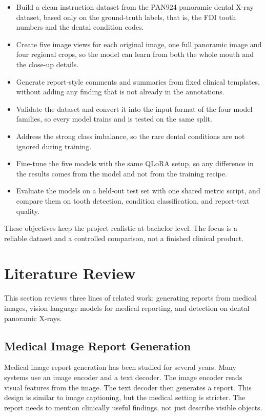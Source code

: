 \documentclass[a4paper,12pt]{report}
\begin{document}
\begin{itemize}
    \item Build a clean instruction dataset from the PAN924 panoramic dental X-ray dataset, based only on the ground-truth labels, that is, the FDI tooth numbers and the dental condition codes.
    \item Create five image views for each original image, one full panoramic image and four regional crops, so the model can learn from both the whole mouth and the close-up details.
    \item Generate report-style comments and summaries from fixed clinical templates, without adding any finding that is not already in the annotations.
    \item Validate the dataset and convert it into the input format of the four model families, so every model trains and is tested on the same split.
    \item Address the strong class imbalance, so the rare dental conditions are not ignored during training.
    \item Fine-tune the five models with the same QLoRA setup, so any difference in the results comes from the model and not from the training recipe.
    \item Evaluate the models on a held-out test set with one shared metric script, and compare them on tooth detection, condition classification, and report-text quality.
\end{itemize}

These objectives keep the project realistic at bachelor level. The focus is a reliable dataset and a controlled comparison, not a finished clinical product.

\section{Literature Review}

This section reviews three lines of related work: generating reports from medical images, vision language models for medical reporting, and detection on dental panoramic X-rays.

\subsection{Medical Image Report Generation}
Medical image report generation has been studied for several years. Many systems use an image encoder and a text decoder. The image encoder reads visual features from the image. The text decoder then generates a report. This design is similar to image captioning, but the medical setting is stricter. The report needs to mention clinically useful findings, not just describe visible objects.
\end{document}
